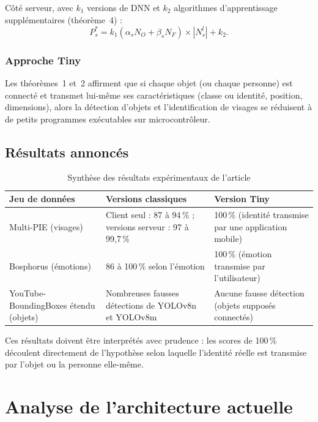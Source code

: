 \documentclass[11pt,a4paper]{report}
\begin{document}
Côté serveur, avec $k_1$ versions de DNN et $k_2$ algorithmes d'apprentissage supplémentaires (théorème~4) :
\begin{equation}
  P^{*}_{s} = k_1(\alpha_s N_O + \beta_s N_F)\times |N^{l}_{s}| + k_2 .
\end{equation}

\subsection{Approche Tiny}
Les théorèmes~1 et~2 affirment que si chaque objet (ou chaque personne) est connecté et transmet lui-même ses caractéristiques (classe ou identité, position, dimensions), alors la détection d'objets et l'identification de visages se réduisent à de petits programmes exécutables sur microcontrôleur.

\section{Résultats annoncés}

\begin{table}[H]
\centering
\caption{Synthèse des résultats expérimentaux de l'article}
\label{tab:resultats}
\begin{tabularx}{\textwidth}{l L L}
\toprule
{}\textbf{Jeu de données} & \textbf{Versions classiques} & \textbf{Version Tiny}\\
\midrule
Multi-PIE (visages) & Client seul : 87 à 94\,\% ; versions serveur : 97 à 99,7\,\% & 100\,\% (identité transmise par une application mobile)\\
Bosphorus (émotions) & 86 à 100\,\% selon l'émotion & 100\,\% (émotion transmise par l'utilisateur)\\
YouTube-BoundingBoxes étendu (objets) & Nombreuses fausses détections de YOLOv8n et YOLOv8m & Aucune fausse détection (objets supposés connectés)\\
\bottomrule
\end{tabularx}
\end{table}

Ces résultats doivent être interprétés avec prudence : les scores de 100\,\% découlent directement de l'hypothèse selon laquelle l'identité réelle est transmise par l'objet ou la personne elle-même.

\chapter{Analyse de l'architecture actuelle}\label{ch:analyse}
\end{document}
